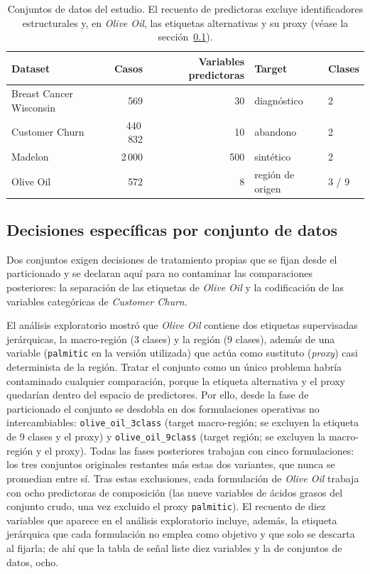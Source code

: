 \begin{table}[!htbp]
  \centering
  \caption[Conjuntos de datos del estudio]{Conjuntos de datos del estudio. El recuento de predictoras
    excluye identificadores estructurales y, en \textit{Olive Oil},
    las etiquetas alternativas y su proxy (véase la
    sección~\ref{sec:oliveoil}).}
  \label{tab:datasets}
  \begin{tabular}{lrrll}
    \toprule
    Dataset & Casos & Variables predictoras & Target & Clases \\
    \midrule
    Breast Cancer Wisconsin & 569 & 30 & diagnóstico & 2 \\
    Customer Churn & 440\,832 & 10 & abandono & 2 \\
    Madelon & 2\,000 & 500 & sintético & 2 \\
    Olive Oil & 572 & 8 & región de origen & 3 / 9 \\
    \bottomrule
  \end{tabular}
\end{table}

\subsection{Decisiones específicas por conjunto de datos}
\label{sec:oliveoil}

Dos conjuntos exigen decisiones de tratamiento propias que se fijan
desde el particionado y se declaran aquí para no contaminar las
comparaciones posteriores: la separación de las etiquetas de
\textit{Olive Oil} y la codificación de las variables categóricas de
\textit{Customer Churn}.

El análisis exploratorio mostró que \textit{Olive Oil} contiene dos
etiquetas supervisadas jerárquicas, la macro-región (3 clases) y la
región (9 clases), además de una variable (\texttt{palmitic} en la
versión utilizada) que actúa como sustituto (\textit{proxy}) casi
determinista de la región. Tratar el conjunto como un único problema
habría contaminado cualquier comparación, porque la etiqueta
alternativa y el proxy quedarían dentro del espacio de predictores.
Por ello, desde la fase de particionado el conjunto se desdobla en dos
formulaciones operativas no intercambiables:
\texttt{olive\_oil\_3class} (target macro-región; se excluyen la
etiqueta de 9 clases y el proxy) y \texttt{olive\_oil\_9class} (target
región; se excluyen la macro-región y el proxy). Todas las fases
posteriores trabajan con cinco formulaciones: los tres conjuntos
originales restantes más estas dos variantes, que nunca se promedian
entre sí. Tras estas exclusiones, cada formulación de \textit{Olive Oil}
trabaja con ocho predictoras de composición (las nueve variables de
ácidos grasos del conjunto crudo, una vez excluido el proxy
\texttt{palmitic}). El recuento de diez variables que aparece en el
análisis exploratorio incluye, además, la etiqueta jerárquica que cada
formulación no emplea como objetivo y que solo se descarta al fijarla; de
ahí que la tabla de señal liste diez variables y la de conjuntos de datos,
ocho.

